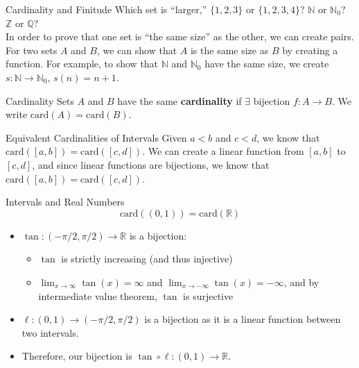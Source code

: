 \documentclass[10pt]{extarticle}
\begin{document}
  \begin{problem}{Cardinality and Finitude}
    Which set is ``larger,'' $\{1,2,3\}$ or $\{1,2,3,4\}$? $\mathbb{N}$ or $\mathbb{N}_0$? $\mathbb{Z}$ or $\mathbb{Q}$?\\

    In order to prove that one set is ``the same size'' as the other, we can create pairs. For two sets $A$ and $B$, we can show that $A$ is the same size as $B$ by creating a function. For example, to show that $\mathbb{N}$ and $\mathbb{N}_0$ have the same size, we create $s:\mathbb{N} \rightarrow \mathbb{N}_0$, $s(n) = n+1$.

    \begin{problem}{Cardinality}
      Sets $A$ and $B$ have the same \textbf{cardinality} if $\exists$ bijection $f:A\rightarrow B$. We write $\text{card}(A) = \text{card}(B)$.
    \end{problem}
    \begin{problem}{Equivalent Cardinalities of Intervals}
      Given $a<b$ and $c<d$, we know that $\text{card}\left([a,b]\right) = \text{card}\left([c,d]\right)$.
      \tcblower
      We can create a linear function from $[a,b]$ to $[c,d]$, and since linear functions are bijections, we know that $\text{card}\left([a,b]\right) = \text{card}\left([c,d]\right)$.
    \end{problem}
    \begin{problem}{Intervals and Real Numbers}
      \[
        \text{card}\left((0,1)\right) = \text{card}(\mathbb{R})
      \] 
      \tcblower
      \begin{itemize}
        \item $\tan: (-\pi/2,\pi/2) \rightarrow \mathbb{R}$ is a bijection:
          \begin{itemize}
            \item $\tan$ is strictly increasing (and thus injective)
            \item $\lim_{x\rightarrow\infty} \tan(x) = \infty$ and $\lim_{x\rightarrow -\infty}\tan(x) = -\infty$, and by intermediate value theorem, $\tan$ is surjective
          \end{itemize}
        \item $\ell: (0,1) \rightarrow (-\pi/2,\pi/2)$ is a bijection as it is a linear function between two intervals.
        \item Therefore, our bijection is $\tan \circ \ell: (0,1) \rightarrow \mathbb{R}$.
      \end{itemize}
    \end{problem}

\end{problem}
\end{document}
